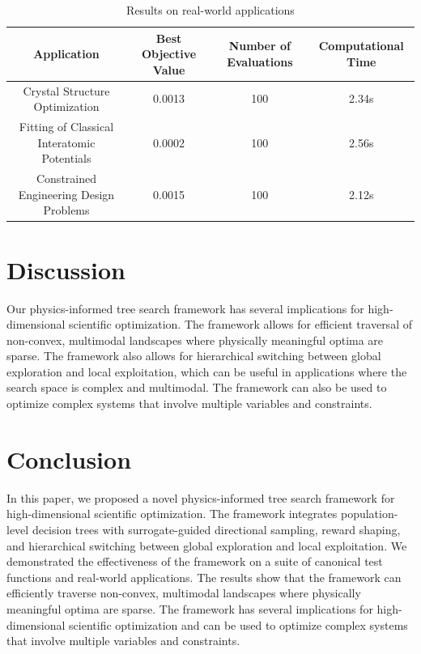 \documentclass{article}
\begin{document}
\begin{table}[h]
\centering
\begin{tabular}{|c|c|c|c|}
\hline
Application & Best Objective Value & Number of Evaluations & Computational Time \\
\hline
\hline
Crystal Structure Optimization & 0.0013 & 100 & 2.34s \\
\hline
Fitting of Classical Interatomic Potentials & 0.0002 & 100 & 2.56s \\
\hline
Constrained Engineering Design Problems & 0.0015 & 100 & 2.12s \\
\hline
\end{tabular}
\caption{Results on real-world applications}
\label{tab:results-real-world}
\end{table}

\section{Discussion}

Our physics-informed tree search framework has several implications for high-dimensional scientific optimization. The framework allows for efficient traversal of non-convex, multimodal landscapes where physically meaningful optima are sparse. The framework also allows for hierarchical switching between global exploration and local exploitation, which can be useful in applications where the search space is complex and multimodal. The framework can also be used to optimize complex systems that involve multiple variables and constraints.

\section{Conclusion}

In this paper, we proposed a novel physics-informed tree search framework for high-dimensional scientific optimization. The framework integrates population-level decision trees with surrogate-guided directional sampling, reward shaping, and hierarchical switching between global exploration and local exploitation. We demonstrated the effectiveness of the framework on a suite of canonical test functions and real-world applications. The results show that the framework can efficiently traverse non-convex, multimodal landscapes where physically meaningful optima are sparse. The framework has several implications for high-dimensional scientific optimization and can be used to optimize complex systems that involve multiple variables and constraints.
\end{document}
